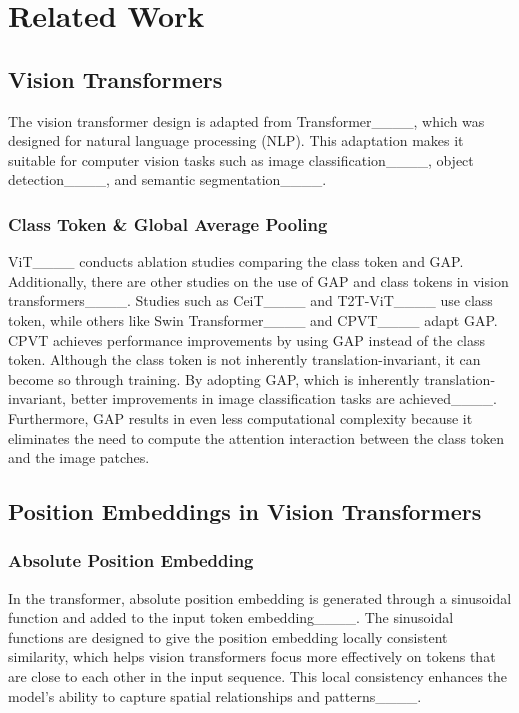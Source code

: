 \section{Related Work}
\subsection{Vision Transformers}
The vision transformer design is adapted from Transformer____, which was designed for natural language processing (NLP). This adaptation makes it suitable for computer vision tasks such as image classification____, object detection____, and semantic segmentation____. 

\subsubsection{Class Token \& Global Average Pooling}
ViT____ conducts ablation studies comparing the class token and GAP. Additionally, there are other studies on the use of GAP and class tokens in vision transformers____. Studies such as CeiT____ and T2T-ViT____ use class token, while others like Swin Transformer____ and CPVT____ adapt GAP. CPVT achieves performance improvements by using GAP instead of the class token. Although the class token is not inherently translation-invariant, it can become so through training. By adopting GAP, which is inherently translation-invariant, better improvements in image classification tasks are achieved____. Furthermore, GAP results in even less computational complexity because it eliminates the need to compute the attention interaction between the class token and the image patches. 

\subsection{Position Embeddings in Vision Transformers}

\subsubsection{Absolute Position Embedding} In the transformer, absolute position embedding is generated through a sinusoidal function and added to the input token embedding____. The sinusoidal functions are designed to give the position embedding locally consistent similarity, which helps vision transformers focus more effectively on tokens that are close to each other in the input sequence. This local consistency enhances the model's ability to capture spatial relationships and patterns____.

